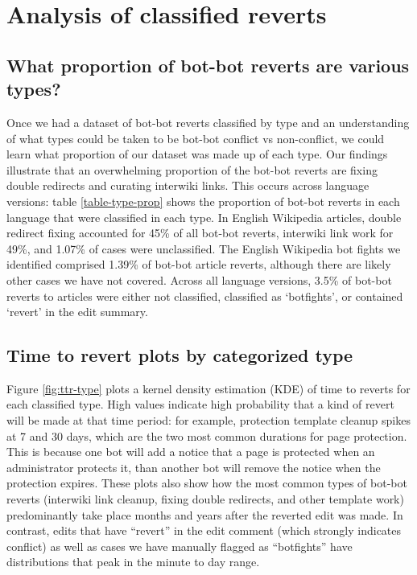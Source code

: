\documentclass[format=acmsmall, review=false, screen=true]{acmart}%
\begin{document}
\section{Analysis of classified reverts} \label{s:coding:results}
\subsection{What proportion of bot-bot reverts are various types?}  
Once we had a dataset of bot-bot reverts classified by type and an understanding of what types could be taken to be bot-bot conflict vs non-conflict, we could learn what proportion of our dataset was made up of each type. Our findings illustrate that an overwhelming proportion of the bot-bot reverts are fixing double redirects and curating interwiki links. This occurs across language versions: table \ref{table-type-prop} shows the proportion of bot-bot reverts in each language that were classified in each type. In English Wikipedia articles, double redirect fixing accounted for 45\% of all bot-bot reverts, interwiki link work for 49\%,  and 1.07\% of cases were unclassified. The English Wikipedia bot fights we identified comprised 1.39\% of bot-bot article reverts, although there are likely other cases we have not covered. Across all language versions,  3.5\% of bot-bot reverts to articles were either not classified, classified as `botfights', or contained `revert' in the edit summary.

\subsection{Time to revert plots by categorized type}  
Figure \ref{fig:ttr-type} plots a kernel density estimation (KDE) of time to reverts for each classified type. High values indicate high probability that a kind of revert will be made at that time period: for example, protection template cleanup spikes at 7 and 30 days, which are the two most common durations for page protection. This is because one bot will add a notice that a page is protected when an administrator protects it, than another bot will remove the notice when the protection expires. These plots also show how the most common types of bot-bot reverts (interwiki link cleanup, fixing double redirects, and other template work) predominantly take place months and years after the reverted edit was made. In contrast, edits that have ``revert'' in the edit comment (which strongly indicates conflict) as well as cases we have manually flagged as ``botfights'' have distributions that peak in the minute to day range.  
\end{document}
